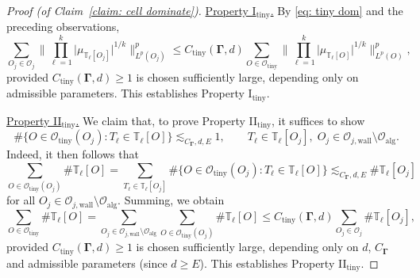 \documentclass[reqno]{amsart}
\numberwithin{equation}{section}
\newcommand{\T}{\mathbb{T}}
\newcommand{\cO}{\mathcal{O}}
\newcommand{\bdGamma}{\boldsymbol{\Gamma}}
\theoremstyle{plain}
\theoremstyle{definition}
\newcommand{\ttiny}{\mathrm{tiny}}
\newcommand{\alg}{\mathrm{alg}}
\newcommand{\wall}{\mathrm{wall}}
\begin{document}
\begin{proof}[Proof (of Claim~\ref{claim: cell dominate})]
\noindent \underline{Property I$_{\ttiny}$.} By \eqref{eq: tiny dom} and the preceding observations,
\begin{equation*}
    \sum_{O_j \in \cO_j} \Big\|\prod_{\ell = 1}^k \big| \mu_{\T_{\ell}[O_j]}  \big|^{1/k} \Big\|_{L^p(O_j)}^p \leq C_{\ttiny}(\bdGamma, d) \sum_{O \in \cO_{\ttiny}} \Big\|\prod_{\ell = 1}^k \big| \mu_{\T_{\ell}[O]} \big|^{1/k} \Big\|_{L^p(O)}^p,
\end{equation*}
provided $C_{\ttiny}(\bdGamma, d) \geq 1$ is chosen sufficiently large, depending only on admissible parameters. This establishes Property I$_{\ttiny}$.\medskip

\noindent \underline{Property II$_{\ttiny}$.} We claim that, to prove Property II$_{\ttiny}$, it suffices to show
\begin{equation}\label{eq: tiny dom 2}
    \#\big\{O \in \cO_{\ttiny}(O_j) : T_{\ell} \in   \T_{\ell}[O]\big\} \lesssim_{C_{\bdGamma},d,E} 1, \qquad T_{\ell} \in \T_{\ell}[O_j], \;O_j \in \cO_{j,\wall} \setminus \cO_{\alg}.
\end{equation}
Indeed, it then follows that
\begin{equation*}
     \sum_{O \in \cO_{\ttiny}(O_j)} \#\T_{\ell}[O] = \sum_{T_{\ell} \in \T_{\ell}[O_j]} \#\big\{O \in \cO_{\ttiny}(O_j) : T_{\ell} \in   \T_{\ell}[O]\big\} \lesssim_{C_{\bdGamma}, d, E} \#\T_{\ell}[O_j]
\end{equation*}
for all $O_j \in \cO_{j,\wall} \setminus \cO_{\alg}$. Summing, we obtain
\begin{equation*}
    \sum_{O \in \cO_{\ttiny}} \#\T_{\ell}[O] = \sum_{O_j \in \cO_{j,\wall} \setminus \cO_{\alg}} \sum_{O \in \cO_{\ttiny}(O_j)} \#\T_{\ell}[O] \leq C_{\ttiny}(\bdGamma, d) \sum_{O_j \in \cO_j} \#\T_{\ell}[O_j],
\end{equation*}
provided $C_{\ttiny}(\bdGamma, d) \geq 1$ is chosen sufficiently large, depending only on $d$, $C_{\bdGamma}$ and admissible parameters (since $d \geq E$). This establishes Property II$_{\ttiny}$.


\end{proof}
\end{document}
